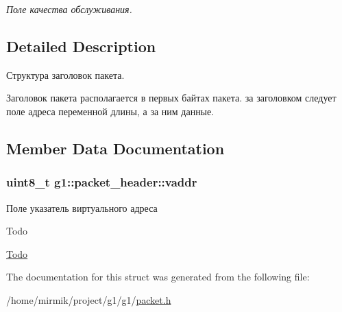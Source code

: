 \begin{DoxyCompactItemize}
\begin{DoxyCompactList}\small\item\em Поле качества обслуживания. \end{DoxyCompactList}\end{DoxyCompactItemize}


\subsection{Detailed Description}
Структура заголовок пакета. 

Заголовок пакета располагается в первых байтах пакета. за заголовком следует поле адреса переменной длины, а за ним данные. 

\subsection{Member Data Documentation}
\subsubsection[{\texorpdfstring{vaddr}{vaddr}}]{\setlength{\rightskip}{0pt plus 5cm}uint8\+\_\+t g1\+::packet\+\_\+header\+::vaddr}\hypertarget{structg1_1_1packet__header_af77da0c7bd8984cd085ef435241be26d}{}\label{structg1_1_1packet__header_af77da0c7bd8984cd085ef435241be26d}


Поле указатель виртуального адреса 

\begin{DoxyRefDesc}{Todo}
\item[\hyperlink{todo__todo000001}{Todo}]\end{DoxyRefDesc}


The documentation for this struct was generated from the following file\+:\begin{DoxyCompactItemize}
\item 
/home/mirmik/project/g1/g1/\hyperlink{packet_8h}{packet.\+h}\end{DoxyCompactItemize}
